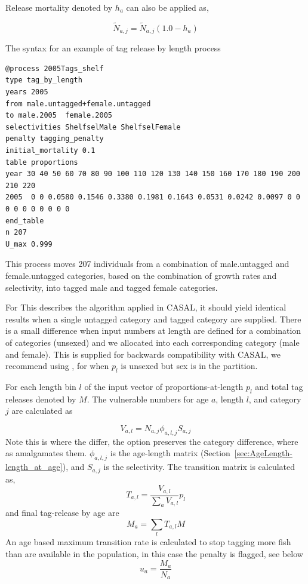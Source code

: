 Release mortality denoted by \(h_a\) can also be applied as,

$$\widetilde{N}_{a,j} = \widetilde{N}_{a,j}\left(1.0 - h_a\right)$$


The syntax for an example of tag release by length process
{\small{\begin{verbatim}
@process 2005Tags_shelf
type tag_by_length
years 2005
from male.untagged+female.untagged
to male.2005  female.2005
selectivities ShelfselMale ShelfselFemale
penalty tagging_penalty
initial_mortality 0.1
table proportions
year 30 40 50 60 70 80 90 100 110 120 130 140 150 160 170 180 190 200 210 220
2005  0 0 0.0580 0.1546 0.3380 0.1981 0.1643 0.0531 0.0242 0.0097 0 0 0 0 0 0 0 0 0 0
end_table
n 207
U_max 0.999
\end{verbatim}}}

This process moves 207 individuals from a combination of male.untagged and female.untagged categories, based on the combination of growth rates and selectivity, into tagged male and tagged female categories.


For 
This describes the algorithm applied in CASAL, it should yield identical results when a single untagged category and tagged category are supplied. There is a small difference when input numbers at length are defined for a combination of categories (unsexed) and we allocated into each corresponding category (male and female). This is supplied for backwards compatibility with CASAL, we recommend using , for when ${p}_l$ is unsexed but sex is in the partition.


For each length bin $l$ of the input vector of proportions-at-length ${p}_l$ and total tag releases denoted by \(M\). The vulnerable numbers for age \(a\), length \(l\), and category \(j\) are calculated as

$$V_{a,l} = N_{a,j} \phi_{a,l,j} S_{a,j}$$
Note this is where the  differ, the  option preserves the category difference, where as  amalgamates them. \(\phi_{a,l,j}\) is the age-length matrix (Section~\ref{sec:AgeLength-length_at_age}), and \(S_{a,j}\) is the selectivity. The transition matrix is calculated as,
$$ T_{a,l}= \frac{V_{a,l}}{\sum_a V_{a,l}} {p}_l$$
and final tag-release by age are
$$ M_{a} = \sum_l T_{a,l}M  $$
An age based maximum transition rate is calculated to stop tagging more fish than are available in the population, in this case the penalty is flagged, see below
$$ u_{a} = \frac{ M_{a} }{ N_{a}}  $$

